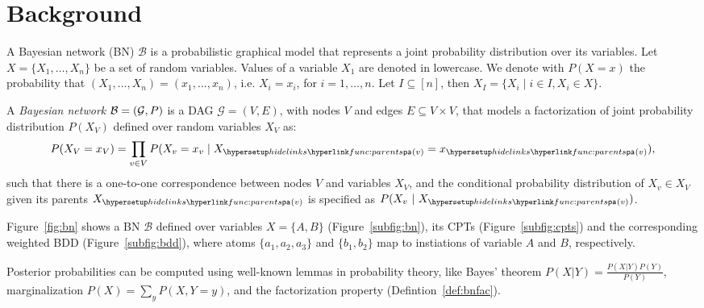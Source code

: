 
\section{Background}
\label{sec:background}

A Bayesian network (BN) $\mathcal{B}$ is a probabilistic graphical model that represents a joint probability distribution over its variables. Let $X = \{X_1,\ldots,X_n\}$ be a set of random variables.
Values of a variable $X_1$ are denoted in lowercase.
We denote with $P(X = x)$ the probability that $(X_1,\ldots,X_n) = (x_1,\ldots,x_n)$,
i.e. $X_i = x_i$, for $i =1,\ldots,n$.
Let  $I \subseteq [n]$, then $X_I = \{X_i \mid i \in I, X_i \in X\}$. %

\begin{definition}\label{def:bnfac}
    \ULforem
    A \emph{Bayesian network} $\mathcal{B} = \left( \mathcal{G},P \right)$ is a DAG $\mathcal{G} = (V,E)$, with nodes $V$ and edges $E \subseteq V \times V$, that models a factorization of joint probability distribution $P(X_V)$ defined over random variables $X_V$ as:%
    \begin{equation}
    P(X_V = x_V) = \prod_{v \in V}P(X_v = x_v \mid X_{\myparents(v)}= x_{\myparents(v)}),
    \end{equation}%
    \noindent such that there is a one-to-one correspondence between nodes $V$ and variables $X_V$, and the conditional probability distribution of $X_v \in X_V$ given its parents $X_{\myparents(v)}$ is specified as $P(X_v\ |\ X_{\myparents(v)})$.

\end{definition}

\begin{example}\label{ex:full}\label{ex:bn}
 Figure~\ref{fig:bn} shows a BN $\mathcal{B}$ defined over variables $X = \{A,B\}$ (Figure~\ref{subfig:bn}), its CPTs (Figure~\ref{subfig:cpts}) and the corresponding weighted BDD (Figure~\ref{subfig:bdd}), where atoms $\{a_1,a_2,a_3\}$ and $\{b_1,b_2\}$ map to instiations of variable $A$ and $B$, respectively.
 \vspace{-1em}

\end{example}

Posterior probabilities can be computed using well-known lemmas in probability theory, like Bayes’ theorem $P(X | Y) = \frac{P(X | Y)P(Y)}{P(Y)}$,
marginalization $P(X) = \sum_{y} P(X, Y = y)$, and the factorization property (Defintion~\ref{def:bnfac}).



